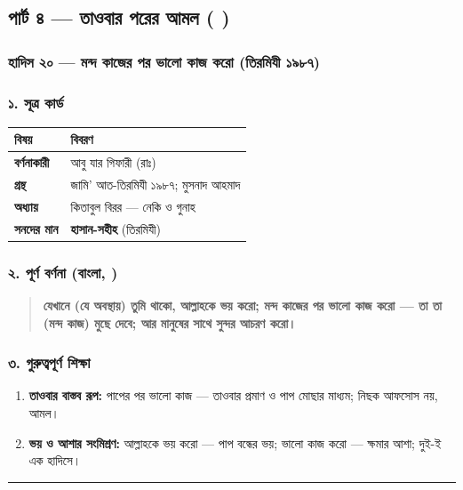 \subsection*{পার্ট ৪ — তাওবার পরের আমল (  )}

\subsubsection*{হাদিস ২০ — মন্দ কাজের পর ভালো কাজ করো (তিরমিযী ১৯৮৭)}

\subsubsection*{১. সূত্র কার্ড}

\begin{table}[h]\centering\small
\begin{tabular}{ll}
বিষয় & বিবরণ \\
\hline
\textbf{বর্ণনাকারী} & আবু যার গিফারী (রাঃ) \\
\textbf{গ্রন্থ} & জামি' আত-তিরমিযী ১৯৮৭; মুসনাদ আহমাদ \\
\textbf{অধ্যায়} & কিতাবুল বিরর — নেকি ও গুনাহ \\
\textbf{সনদের মান} & \textbf{হাসান-সহীহ} (তিরমিযী) \\
\hline
\end{tabular}
\end{table}

\subsubsection*{২. পূর্ণ বর্ণনা (বাংলা, )}

\begin{quote}
\textbf{যেখানে (যে অবস্থায়) তুমি থাকো, আল্লাহকে ভয় করো; মন্দ কাজের পর ভালো কাজ করো — তা তা (মন্দ কাজ) মুছে দেবে; আর মানুষের সাথে সুন্দর আচরণ করো।}
\end{quote}

\subsubsection*{৩. গুরুত্বপূর্ণ শিক্ষা}

\begin{enumerate}
\item \textbf{তাওবার বাস্তব রূপ:} পাপের পর ভালো কাজ — তাওবার প্রমাণ ও পাপ মোছার মাধ্যম; নিছক আফসোস নয়, আমল।
\item \textbf{ভয় ও আশার সংমিশ্রণ:} আল্লাহকে ভয় করো — পাপ বন্ধের ভয়; ভালো কাজ করো — ক্ষমার আশা; দুই-ই এক হাদিসে।
\end{enumerate}
\medskip\hrule\medskip

